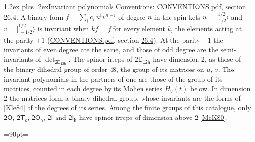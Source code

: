 \documentclass[10pt,a4paper]{article}
\makeatletter
\renewcommand\section{\@startsection{section}{1}{\z@}{-3ex plus -1ex minus -.2ex}%
  {1.2ex plus .2ex}{\normalfont\large\sffamily\bfseries\color{parttitle}}}
\newcommand{\needspace}[1]{\par\penalty-100\begingroup\dimen0=#1\relax\dimen2=\pagegoal
  \advance\dimen2-\pagetotal\ifdim\dimen0>\dimen2\relax\ifdim\dimen2>0pt\vfil\break\fi\fi
  \endgroup}
\numberwithin{equation}{section}
\newcommand{\grp}[1]{\mathsf{#1}}
\newcommand{\jm}[2]{\bigl\lvert{}^{#1}_{\,#2}\bigr\rangle}
\makeatother
\begin{document}
\section{Invariant polynomials}\label{s:invariants}
Conventions: \href{../../CONVENTIONS.pdf}{CONVENTIONS.pdf}, section \href{../../CONVENTIONS.pdf\#conv.26.4}{26.4}.
\leavevmode\label{n:local.binary.form}A binary form $f = \sum_i c_i\, u^i v^{n-i}$ of degree $n$ in the spin kets $u = \jm{1/2}{1/2}$ and $v = \jm{1/2}{-1/2}$ is invariant when $k f = f$ for every element $k$, the elements acting at the parity $+1$ (\href{../../CONVENTIONS.pdf}{CONVENTIONS.pdf}, section \href{../../CONVENTIONS.pdf\#conv.26.4}{26.4}). At the parity $-1$ the invariants of even degree are the same, and those of odd degree are the semi-invariants of $\det_{\grp{2D_{12h}}}$.
The spinor irreps of $\grp{2D_{12h}}$ have dimension 2, as those of the binary dihedral group of order 48, the group of its matrices on $u$, $v$. \label{n:function.hilbert}The invariant polynomials in the partners of one are those of the group of its matrices, counted in each degree by its Molien series $H_V(t)$ below. In dimension 2 the matrices form a binary dihedral group, whose invariants are the forms of [\href{../../../REFERENCES.pdf\#ref.Kle84}{Kle84}] of the degrees of its series. Among the finite groups of this catalogue, only $\grp{2O}$, $\grp{2T_{d}}$, $\grp{2O_{h}}$, $\grp{2I}$ and $\grp{2I_{h}}$ have spinor irreps of dimension above 2 [\href{../../../REFERENCES.pdf\#ref.McK80}{McK80}].
\needspace{90pt}
\end{document}
